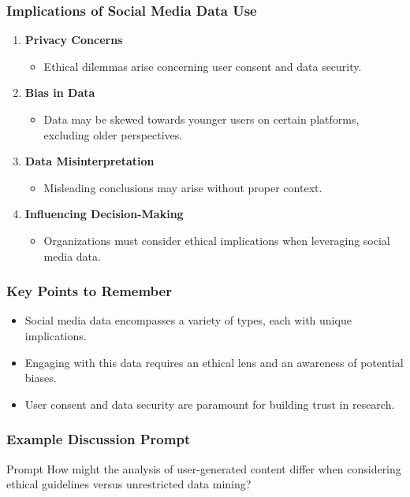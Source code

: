 \documentclass{beamer}
\begin{document}
\begin{frame}[fragile]
    \frametitle{Implications of Social Media Data Use}
    \begin{enumerate}
        \item \textbf{Privacy Concerns}
            \begin{itemize}
                \item Ethical dilemmas arise concerning user consent and data security.
            \end{itemize}
        \item \textbf{Bias in Data}
            \begin{itemize}
                \item Data may be skewed towards younger users on certain platforms, excluding older perspectives.
            \end{itemize}
        \item \textbf{Data Misinterpretation}
            \begin{itemize}
                \item Misleading conclusions may arise without proper context.
            \end{itemize}
        \item \textbf{Influencing Decision-Making}
            \begin{itemize}
                \item Organizations must consider ethical implications when leveraging social media data.
            \end{itemize}
    \end{enumerate}
\end{frame}

\begin{frame}[fragile]
    \frametitle{Key Points to Remember}
    \begin{itemize}
        \item Social media data encompasses a variety of types, each with unique implications.
        \item Engaging with this data requires an ethical lens and an awareness of potential biases.
        \item User consent and data security are paramount for building trust in research.
    \end{itemize}
\end{frame}

\begin{frame}[fragile]
    \frametitle{Example Discussion Prompt}
    \begin{block}{Prompt}
        How might the analysis of user-generated content differ when considering ethical guidelines versus unrestricted data mining?
    \end{block}
\end{frame}
\end{document}
